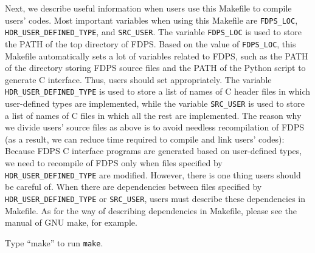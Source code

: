 \endifFtn %
\ifC %
Next, we describe useful information when users use this Makefile to compile users' codes. Most important variables when using this Makefile are \texttt{FDPS\_LOC}, \texttt{HDR\_USER\_DEFINED\_TYPE}, and \texttt{SRC\_USER}. The variable \texttt{FDPS\_LOC} is used to store the PATH of the top directory of FDPS. Based on the value of \texttt{FDPS\_LOC}, this Makefile automatically sets a lot of variables related to FDPS, such as the PATH of the directory storing FDPS source files and the PATH of the Python script to generate C interface. Thus, users should set appropriately. The variable \texttt{HDR\_USER\_DEFINED\_TYPE} is used to store a list of names of C header files in which user-defined types are implemented, while the variable \texttt{SRC\_USER} is used to store a list of names of C files in which all the rest are implemented. The reason why we divide users' source files as above is to avoid needless recompilation of FDPS (as a result, we can reduce time required to compile and link users' codes): Because FDPS C interface programs are generated based on user-defined types, we need to recompile of FDPS only when files specified by \texttt{HDR\_USER\_DEFINED\_TYPE} are modified. However, there is one thing users should be careful of. When there are dependencies between files specified by \texttt{HDR\_USER\_DEFINED\_TYPE} or \texttt{SRC\_USER}, users must describe these dependencies in Makefile. As for the way of describing dependencies in Makefile, please see the manual of GNU make, for example.
\endifC

Type ``make'' to run \texttt{make}.


